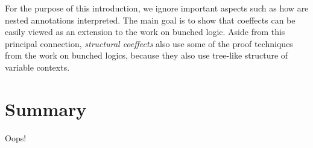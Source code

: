 For the purpose of this introduction, we ignore important aspects such as how are nested annotations
interpreted. The main goal is to show that coeffects can be easily viewed as an extension to the 
work on bunched logic. Aside from this principal connection, \emph{structural coeffects} also 
use some of the proof techniques from the work on bunched logics, because they also use tree-like
structure of variable contexts.


\section{Summary}
Oops!

% 
